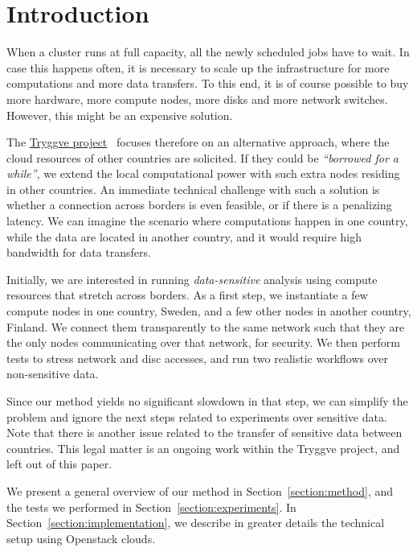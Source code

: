\section{Introduction}
\label{section:intro}

When a cluster runs at full capacity, all the newly scheduled jobs
have to wait. In case this happens often, it is necessary to scale up
the infrastructure for more computations and more data transfers. To
this end, it is of course possible to buy more hardware, \ie more
compute nodes, more disks and more network switches. However, this
might be an expensive solution.

The \href{https://wiki.neic.no/wiki/Tryggve}{Tryggve
  project}~\cite{tryggve} focuses therefore on an alternative
approach, where the cloud resources of other countries are solicited.
%
If they could be \emph{``borrowed for a while''}, we extend the local
computational power with such extra nodes residing in other countries.
%
An immediate technical challenge with such a solution is whether a
connection across borders is even feasible, or if there is a
penalizing latency. We can imagine the scenario where computations
happen in one country, while the data are located in another country,
and it would require high bandwidth for data transfers.

Initially, we are interested in running \emph{data-sensitive}
analysis using compute resources that stretch across borders.
%
As a first step, we instantiate a few compute nodes in one country,
Sweden, and a few other nodes in another country, Finland. We
connect them transparently to the same network such that they are
the only nodes communicating over that network, for security. We then
perform tests to stress network and disc accesses, and run two
realistic workflows over non-sensitive data.

Since our method yields no significant slowdown in that step, we
can simplify the problem and ignore the next steps related to
experiments over sensitive data.
%
Note that there is another issue related to the transfer of sensitive
data between countries. This legal matter is an ongoing work within
the Tryggve project, and left out of this paper.

We present a general overview of our method in
Section~\ref{section:method}, and the tests we performed in
Section~\ref{section:experiments}.
%
In Section~\ref{section:implementation}, we describe in greater
details the technical setup using Openstack clouds.
